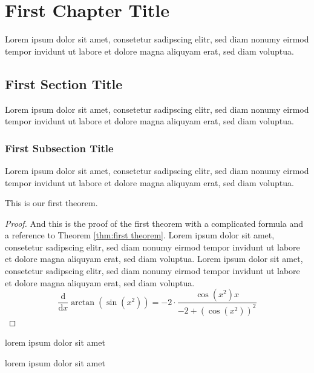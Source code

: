 \chapter{First Chapter Title}

Lorem ipsum dolor sit amet, consetetur sadipscing elitr, sed diam nonumy
eirmod tempor invidunt ut labore et dolore magna aliquyam erat, sed diam
voluptua.

\section{First Section Title}

Lorem ipsum dolor sit amet, consetetur sadipscing elitr, sed diam nonumy
eirmod tempor invidunt ut labore et dolore magna aliquyam erat, sed diam
voluptua.

\subsection{First Subsection Title}

Lorem ipsum dolor sit amet, consetetur sadipscing elitr, sed diam nonumy
eirmod tempor invidunt ut labore et dolore magna aliquyam erat, sed diam
voluptua.

\begin{theorem} \label{thm:first theorem} This is our first
theorem. \end{theorem}

\begin{proof} And this is the proof of the first theorem with a complicated
formula and a reference to Theorem \ref{thm:first theorem}. Lorem ipsum dolor
sit amet, consetetur sadipscing elitr, sed diam nonumy eirmod tempor invidunt
ut labore et dolore magna aliquyam erat, sed diam voluptua. Lorem ipsum dolor
sit amet, consetetur sadipscing elitr, sed diam nonumy eirmod tempor invidunt
ut labore et dolore magna aliquyam erat, sed diam voluptua. \begin{equation}
{\frac {\mathrm d}{\mathrm dx}}\arctan(\sin({x}^{2}))=-2 \cdot {\frac
{\cos({x}^{2})x}{-2+\left (\cos({x}^{2})\right )^{2}}} \end{equation}
\end{proof}

\begin{lemma} lorem ipsum dolor sit amet \end{lemma}

\begin{corollary} lorem ipsum dolor sit amet \end{corollary}

